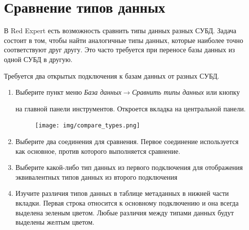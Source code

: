 \newpage

\section{Сравнение типов данных}\label{sec:compare_datatype}

В Red Expert есть возможность сравнить типы данных разных СУБД. Задача состоит в том, чтобы найти аналогичные типы данных, которые наиболее точно соответствуют друг другу. Это часто требуется при переносе базы данных из одной СУБД в другую.

Требуется два открытых подключения к базам данных от разных СУБД.

\begin{enumerate}[leftmargin=39pt]
	\item Выберите пункт меню  \textit{База данных}$\rightarrow$\textit{Сравнить типы данных} или кнопку  на главной панели инструментов. Откроется вкладка на центральной панели.
	\begin{figure}[H]
		\flushright
		\texttt{[image: img/compare\_types.png]}
	\end{figure}
	\item Выберите два соединения для сравнения. Первое соединение используется как основное, против которого выполняется сравнение.
	\item Выберите какой-либо тип данных из первого подключения для отображения эквивалентных типов данных из второго подключения
	\item Изучите различия типов данных в таблице метаданных в нижней части вкладки. Первая строка относится к основному подключению и она всегда выделена зеленым цветом. Любые различия между типами данных будут выделены желтым цветом.
\end{enumerate}

\newpage

